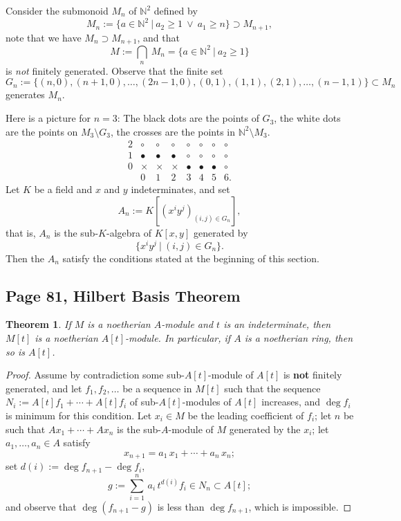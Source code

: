 \documentclass[parskip=half,fontsize=12pt]{scrartcl}%
\newtheorem{thm}{Theorem}%
\begin{document}
Consider the submonoid $M_n$ of $\mathbb N^2$ defined by 
$$
M_n:=\{a\in\mathbb N^2\ |\ a_2\ge1\ \lor\ a_1\ge n\}\supset M_{n+1},
$$ 
note that we have $M_n\supset M_{n+1}$, and that 
$$
M:=\bigcap_n\ M_n=\{a\in\mathbb N^2\ |\ a_2\ge1\}
$$ 
is \emph{not} finitely generated. Observe that the finite set 
$$
G_n:=\{(n,0),(n+1,0),\dots,(2n-1,0),(0,1),(1,1),(2,1),\dots,(n-1,1)\}\subset M_n
$$ 
generates $M_n$. 

Here is a picture for $n=3$: The black dots are the points of $G_3$, the white dots are the points on $M_3\setminus G_3$, the crosses are the points in $\mathbb N^2\setminus M_3$.
$$
\begin{matrix}
2&\circ&\circ&\circ&\circ&\circ&\circ&\circ\\ 
1&\bullet&\bullet&\bullet&\circ&\circ&\circ&\circ\\ 
0&\times&\times&\times&\bullet&\bullet&\bullet&\circ\\ 
&0&1&2&3&4&5&6.
\end{matrix}
$$
Let $K$ be a field and $x$ and $y$ indeterminates, and set  
$$
A_n:=K\left[(x^iy^j)_{(i,j)\in G_n}\right],
$$ 
that is, $A_n$ is the sub-$K$-algebra of $K[x,y]$ generated by 
$$
\{x^iy^j\ |\ (i,j)\in G_n\}.
$$ 
Then the $A_n$ satisfy the conditions stated at the beginning of this section.

\subsection{Page 81, Hilbert Basis Theorem}%

\begin{thm}\label{hbt}
If $M$ is a noetherian $A$-module and $t$ is an indeterminate, then $M[t]$ is a noetherian $A[t]$-module. In particular, if $A$ is a noetherian ring, then so is $A[t]$.
\end{thm}

\begin{proof}
Assume by contradiction some sub-$A[t]$-module of $A[t]$ is \textbf{not} finite\-ly generated, and let $f_1,f_2,\dots$ be a sequence in $M[t]$ such that the sequence $N_i:=A[t]f_1+\cdots+A[t]f_i$ of sub-$A[t]$-modules of $A[t]$ increases, and $\deg f_i$ is minimum for this condition. Let $x_i\in M$ be the leading coefficient of $f_i$; let $n$ be such that $Ax_1+\cdots+Ax_n$ is the sub-$A$-module of $M$ generated by the $x_i$; let $a_1,\dots,a_n\in A$ satisfy 
$$
x_{n+1}=a_1\,x_1+\cdots+a_n\,x_n;
$$ 
set $d(i):=\deg f_{n+1}-\deg f_i$, 
$$
g:=\sum_{i=1}^n\,a_i\,t^{d(i)}f_i\in N_n\subset A[t];
$$ 
and observe that $\deg(f_{n+1}-g)$ is less than $\deg f_{n+1}$, which is impossible.
\end{proof}
\end{document}
